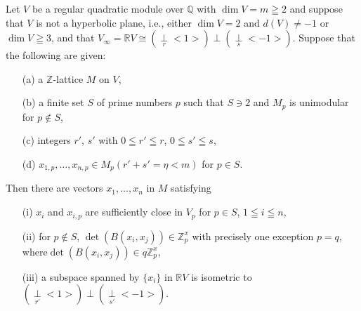 \setcounter{section}{2}
\setcounter{theorem}{32}
\begin{theorem}\label{c2:thm-2.33}
Let $V$ be a regular quadratic module over $\mathbb{Q}$ with $\dim
V=m\geqq 2$ and suppose that $V$ is not a hyperbolic plane, i.e.,
either $\dim V=2$ and $d(V)\neq -1$ or $\dim V\geqq 3$, and that
$V_{\infty}=\mathbb{R}V\cong
(\mathop{\perp}\limits_r<1>)\perp(\mathop{\perp}\limits_s<-1>)$. Suppose
that the following \pageoriginale are given:
\begin{itemize}
\item[\rm{(a)}] a $\mathbb{Z}$-lattice $M$ on $V$,

\item[\rm{(b)}] a finite set $S$ of prime numbers $p$ such that $S\ni
2$ and $M_p$ is unimodular for $p\not\in S$,

\item[\rm{(c)}] integers $r'$, $s'$ with $0\leqq r'\leqq r$, $0\leqq
s' \leqq s$,

\item[\rm{(d)}] $x_{1,p}, \ldots, x_{n,p} \in M_p
(r'+s'=\eta<m)$ for $p\in S$.
\end{itemize}

Then there are vectors $x_1,\ldots, x_n$ in $M$ satisfying 
\begin{itemize}
\item[\rm{(i)}] $x_i$ and $x_{i,p}$ are sufficiently close in $V_p$
for $p\in S$, $1\leqq i \leqq n$,

\item[\rm{(ii)}] for $p\not\in S$, $\det(B(x_i,
x_j)) \in \mathbb{Z}^x_p$ with precisely one exception $p=q$,
where\break $\det(B(x_i, x_j)) \in q \mathbb{Z}^x_p$,

\item[\rm{(iii)}] a subspace spanned by $\{x_i\}$ in $\mathbb{R}V$ is
isometric to $(\mathop{\perp}\limits_{r'}<1>) \perp
(\mathop{\perp}\limits_{s'} <-1>)$.
\end{itemize}
\end{theorem}


